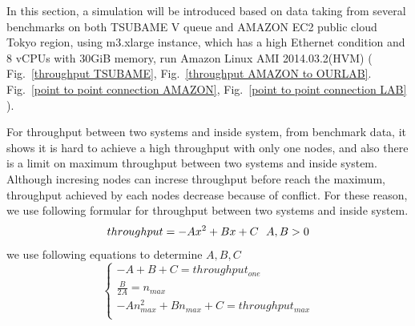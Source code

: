 
In this section, a simulation will be introduced based on data taking from several benchmarks on both TSUBAME V queue and AMAZON EC2 public cloud Tokyo region, using
m3.xlarge instance, which has a high Ethernet condition and 8 vCPUs with 30GiB memory, run Amazon Linux AMI 2014.03.2(HVM) ( Fig.~\ref{throughput TSUBAME}, Fig.~\ref{throughput AMAZON to OURLAB}. Fig.~\ref{point to point connection AMAZON}, Fig.~\ref{point to point connection LAB} ).

	
For throughput between two systems and inside system, from benchmark data, it shows it is hard to achieve a high throughput with only one nodes, and also there is a limit on maximum throughput between two systems and inside system.
Although incresing nodes can increse throughput before reach the maximum, throughput achieved by each nodes decrease because of conflict.
For these reason, we use following formular for throughput between two systems and inside system.
\begin{equation}
throughput=-Ax^2+Bx+C~~ A,B>0\\
\end{equation}
we use following equations to determine $A,B,C$
\begin{equation}
\begin{cases}
	-A+B+C=throughput_{one}\\\nonumber
	\frac{B}{2A}=n_{max}\\\nonumber
	-An_{max}^2+Bn_{max}+C=throughput_{max}\\
\end{cases}
\end{equation}

